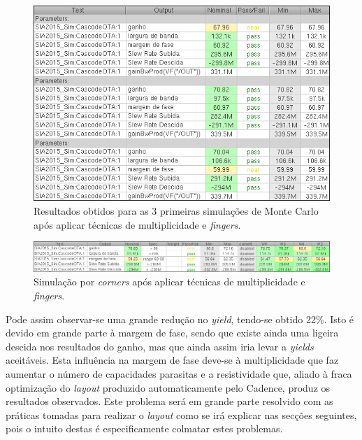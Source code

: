 \documentclass[11pt]{article}
\numberwithin{equation}{section}
\begin{document}
\begin{figure}[H]
	\centering
	\includegraphics[keepaspectratio=true, scale=0.65]{exps/MonteCarlo_3pt_Novo_Sim}
	\vspace{-0.5em}
	\caption{Resultados obtidos para as 3 primeiras simulações de Monte Carlo após aplicar técnicas de multiplicidade e \textit{fingers}.}
	\vspace{-0.8em}
\end{figure} 

\begin{figure}[H]
	\centering
	\includegraphics[keepaspectratio=true, scale=0.65]{exps/Corners_Novo_Sim}
	\vspace{-0.5em}
	\caption{Simulação por \textit{corners} após aplicar técnicas de multiplicidade e \textit{fingers}.}
	\vspace{-0.8em}
\end{figure}

Pode assim observar-se uma grande redução no \textit{yield}, tendo-se obtido 22\%. Isto é devido em grande parte à margem de fase, sendo que existe ainda uma ligeira descida nos resultados do ganho, mas que ainda assim iria levar a \textit{yields} aceitáveis. Esta influência na margem de fase deve-se à multiplicidade que faz aumentar o número de capacidades parasitas e a resistividade que, aliado à fraca optimização do \textit{layout} produzido automaticamente pelo Cadence, produz os resultados observados. Este problema será em grande parte resolvido com as práticas tomadas para realizar o \textit{layout} como se irá explicar nas secções seguintes, pois o intuito destas é especificamente colmatar estes problemas.
\end{document}
